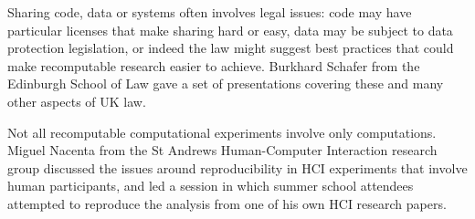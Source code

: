 Sharing code, data or systems often involves legal issues: code
may have particular licenses that make sharing hard or easy, data may
be subject to data protection legislation, or indeed the law might
suggest best practices that could make recomputable research easier to
achieve.  Burkhard Schafer from the Edinburgh School of Law gave a set
of presentations covering these and many other aspects of UK law.

Not all recomputable computational experiments involve only
computations. Miguel Nacenta from the St Andrews Human-Computer
Interaction research group discussed the issues around
reproducibility in HCI experiments that involve human participants,
and led a session in which summer school attendees attempted to
reproduce the analysis from one of his own HCI research papers.
